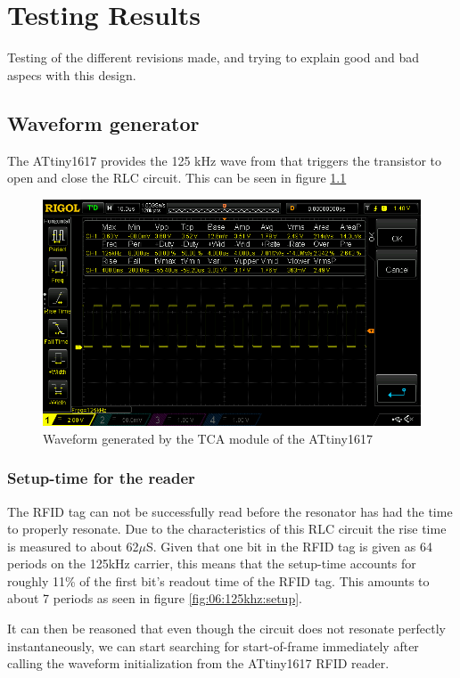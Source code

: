 \chapter{Testing Results}
Testing of the different revisions made, and trying to explain good and bad aspecs with this design.

\section{Waveform generator}
The ATtiny1617 provides the 125 kHz wave from that triggers the transistor to open and close the RLC circuit. This can be seen in figure \ref{fig:125khz:rise}

\begin{figure}[H]
    \centering
    \includegraphics[width=\textwidth]{06_My_Testing_Results/figures/125khz_from_mcu/125_kHz_MCU.png}
    \caption{Waveform generated by the TCA module of the ATtiny1617}
    \label{fig:125khz:rise}
\end{figure}

\subsection{Setup-time for the reader}
The RFID tag can not be successfully read before the resonator has had the time to properly resonate. Due to the characteristics of this RLC circuit the rise time is measured to about 62$\mu$S. Given that one bit in the RFID tag is given as 64 periods on the 125kHz carrier, this means that the setup-time accounts for roughly 11\% of the first bit's readout time of the RFID tag. This amounts to about 7 periods as seen in figure \ref{fig:06:125khz:setup}.
\newline

It can then be reasoned that even though the circuit does not resonate perfectly instantaneously, we can start searching for start-of-frame immediately after calling the waveform initialization from the ATtiny1617 RFID reader.

